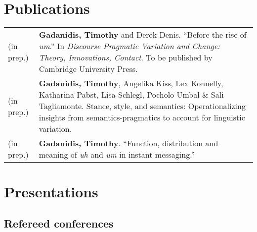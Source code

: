 \documentclass[letterpaper]{article}
\begin{document}

\section*{Publications}
\begin{tabular}{p{}p{}}
    (in prep.) &\textbf{Gadanidis, Timothy} and Derek Denis. ``Before the rise
    of \emph{um}.'' In \textit{Discourse Pragmatic Variation and Change: Theory,
    Innovations, Contact}. To be published by Cambridge University Press. \\
    (in prep.) &\textbf{Gadanidis, Timothy}, Angelika Kiss, Lex Konnelly, Katharina Pabst,
    Lisa Schlegl, Poc\-holo Umbal \& Sali Tagliamonte. Stance,
    style, and semantics: Operationalizing insights from semantics-prag\-matics
    to account for linguistic variation. \\
    (in prep.) &\textbf{Gadanidis, Timothy}. ``Function, distribution and
    meaning of \emph{uh} and \emph{um} in instant messaging.'' \\
\end{tabular}

\section*{Presentations}

\subsection*{Refereed conferences}
\end{document}
